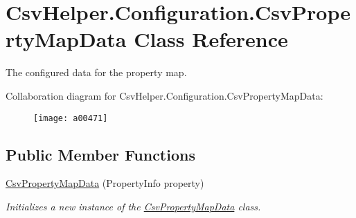 \hypertarget{a00072}{\section{Csv\-Helper.\-Configuration.\-Csv\-Property\-Map\-Data Class Reference}
\label{a00072}
}


The configured data for the property map.  




Collaboration diagram for Csv\-Helper.\-Configuration.\-Csv\-Property\-Map\-Data\-:
\nopagebreak
\begin{figure}[H]
\begin{center}
\leavevmode
\texttt{[image: a00471]}
\end{center}
\end{figure}
\subsection*{Public Member Functions}
\begin{DoxyCompactItemize}
\item 
\hyperlink{a00072_a1a1424683bea80f373e3ea80ae6e39c7}{Csv\-Property\-Map\-Data} (Property\-Info property)
\begin{DoxyCompactList}\small\item\em Initializes a new instance of the \hyperlink{a00072}{Csv\-Property\-Map\-Data} class. \end{DoxyCompactList}\end{DoxyCompactItemize}
